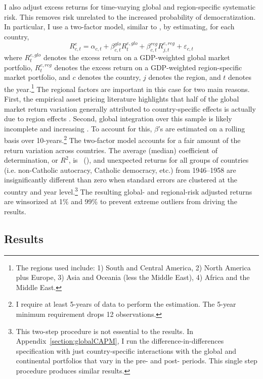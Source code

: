 \documentclass[12pt]{article}
\numberwithin{equation}{section}
\begin{document}
I also adjust excess returns for time-varying global and region-specific systematic risk. This removes risk unrelated to the increased probability of democratization.  In particular, I use a two-factor model, similar to \cite*{Bekaert2009}, by estimating, for each country,
\begin{equation}
R^e_{c,t} = \alpha_{c,t} + \beta^{glo}_{c,t}R^{e,glo}_t + \beta^{reg}_{c,t}R^{e,reg}_{j,t} + \varepsilon_{c,t}\label{eq:twoFactor}
\end{equation}
where $R^{e,glo}_t$ denotes the excess return on a GDP-weighted global market portfolio, $R^{e,reg}_t$ denotes the excess return on a GDP-weighted region-specific market portfolio, and $c$ denotes the country, $j$ denotes the region, and $t$ denotes the year.\footnote{The regions used include: 1) South and Central America, 2) North America plus Europe, 3) Asia and Oceania (less the Middle East), 4) Africa and the Middle East.} The regional factors are important in this case for two main reasons. First, the empirical asset pricing literature highlights that half of the global market return variation generally attributed to country-specific effects is actually due to region effects \citep{Brooks2005}.  Second, global integration over this sample is likely incomplete and increasing \citep{Bekaert1995,Baele2005,Bekaert2009}. To account for this, $\beta$'s are estimated on a rolling basis over 10-years.\footnote{I require at least 5-years of data to perform the estimation. The 5-year minimum requirement drops 12 observations.} The two-factor model accounts for a fair amount of the return variation across countries. The average (median) coefficient of determination, or $R^2$, is \twoFactorRTwoMean\ (\twoFactorRTwoMedian), and unexpected returns for all groups of countries (i.e. non-Catholic autocracy, Catholic democracy, etc.) from 1946--1958 are insignificantly different than zero when standard errors are clustered at the country and year level.\footnote{This two-step procedure is not essential to the results. In Appendix~\ref{section:globalCAPM}, I run the difference-in-differences specification with just country-specific interactions with the global and continental portfolios that vary in the pre- and post- periods. This single step procedure produces similar results.} The resulting global- and regional-risk adjusted returns are winsorized at 1\% and 99\% to prevent extreme outliers from driving the results.

\subsection{Results}
\end{document}
